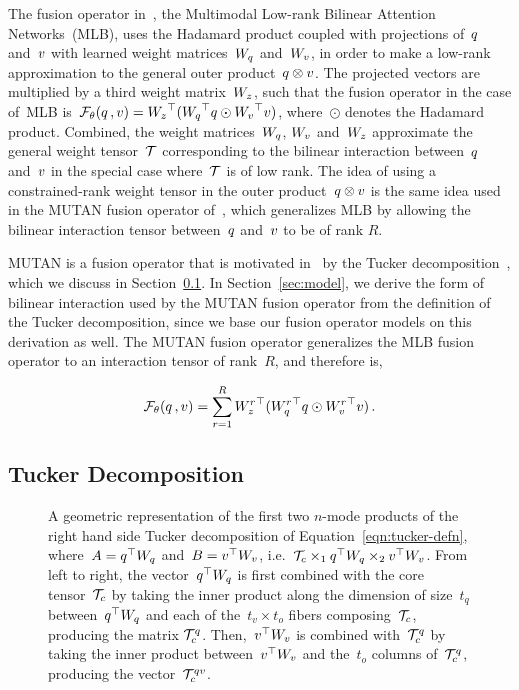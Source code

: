 The fusion operator in~\citet{Kim2017}, the Multimodal Low-rank Bilinear
Attention Networks~(MLB), uses the Hadamard product coupled with projections
of~$q$ and~$v$ with learned weight matrices~$W_{q}$ and~$W_{v}$, in order to
make a low-rank approximation to the general outer product~$q \otimes v$. The
projected vectors are multiplied by a third weight matrix~$W_{z}$, such that
the fusion operator in the case of~MLB
is~$\mathcal{F_{\theta}}{(q \,, v)} = {W_{z}}^\top{} ({W_{q}}^\top{} q \odot {W_{\ensuremath{v}}}^\top{} v)$,
where~$\odot$ denotes the Hadamard product. Combined, the weight
matrices~$W_{q}$, $W_{v}$ and~$W_{z}$ approximate the general weight tensor~$\mathcal{T}$
corresponding to the bilinear interaction between~$q$ and~$v$ in the special
case where~$\mathcal{T}$ is of low rank. The idea of using a constrained-rank weight
tensor in the outer product~$q \otimes v$ is the same idea used in the MUTAN
fusion operator of~\citet{ben2017mutan}, which generalizes MLB by allowing the
bilinear interaction tensor between~$q$ and~$v$ to be of rank $R$.

MUTAN is a fusion operator that is motivated
in~\citet{ben2017mutan} by the Tucker
decomposition~\citep{kolda2009tensor}, which we discuss in
Section~\ref{sec:tucker}. In Section~\ref{sec:model}, we derive the form of
bilinear interaction used by the MUTAN fusion operator from the definition of
the Tucker decomposition, since we base our fusion operator models on this
derivation as well. The MUTAN fusion operator generalizes the MLB fusion
operator to an interaction tensor of rank~$R$, and therefore is,

\begin{equation}
        \mathcal{F_{\theta}}{(q \,, v)} = \sum_{r = 1}^R {W^r_{z}}^\top{} ({W^r_{q}}^\top{} q \odot {W^r_{\ensuremath{v}}}^\top{} v) \,.
\label{eqn:mutan-fusop}
\end{equation}


\subsection{Tucker Decomposition}
\label{sec:tucker}

\newcommand{\qtWq}{\q^\top{} W_\q{}}
\newcommand{\vtWv}{\v^\top{} W_\v{}}
\begin{figure}[!t]
\centering

\caption{A geometric representation of the first two $n$-mode products of the
         right hand side Tucker decomposition of Equation~\ref{eqn:tucker-defn},
         where~$A = \qtWq$ and~$B = \vtWv$, i.e.\ $\T_c \times_1 \qtWq \times_2 \vtWv$.
         From left to right, the vector~$\qtWq$ is first combined with the core
         tensor~$\mathcal{T}_c$ by taking the inner product along the dimension of
         size~$t_q$ between~$\qtWq$ and each of the~$t_v \times t_o$ fibers
         composing~$\mathcal{T}_c$, producing the matrix $\mathcal{T}_c^{q}$.  Then,~$\vtWv$ is
         combined with~$\mathcal{T}_c^{q}$ by taking the inner product between~$\vtWv$
         and the~$t_o$ columns of~$\mathcal{T}_c^{q}$, producing the
         vector~$\mathcal{T}_c^{q{}v{}}$.}
\label{fig:n-mode-prod}
\end{figure}


